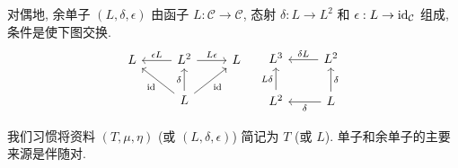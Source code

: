 对偶地, 余单子 $(L, \delta, \epsilon)$ 由函子 $L: \mathcal{C} \to \mathcal{C}$, 态射 $\delta: L \to L^2$ 和 $\epsilon: L \to \mathrm{id}_{\mathcal{C}}$ 组成, 条件是使下图交换.
\begin{equation*}\begin{gathered}
	\begin{tikzcd}
		L  & L^2 \arrow[l, "{\epsilon L}"'] \arrow[r, "{L\epsilon}"] & L \\
		& L \arrow[lu, "\identity"] \arrow[ru, "\identity"'] \arrow[u, "\delta"] &
	\end{tikzcd} \quad
	\begin{tikzcd}
		L^3 & L^2 \arrow[l, "\delta L"'] \\
		L^2 \arrow[u, "L\delta"] & L \arrow[u, "\delta"'] \arrow[l, "\delta"]
	\end{tikzcd}
\end{gathered}\end{equation*}

我们习惯将资料 $(T, \mu, \eta)$ (或 $(L, \delta, \epsilon)$) 简记为 $T$ (或 $L$). 单子和余单子的主要来源是伴随对.

